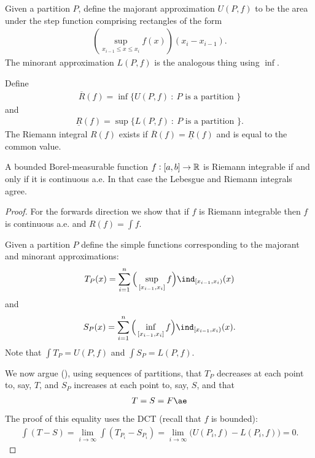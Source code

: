 \begin{definition*}
  Given a partition $P$, define the majorant approximation $U(P, f)$ to be the area under the step function
  comprising rectangles of the form
  \begin{align*}
    (\sup_{x_{i-1} \leq x \leq x_i} f(x))(x_i - x_{i-1}).
  \end{align*}
  The minorant approximation $L(P, f)$ is the analogous thing using $\inf$.

  Define
  \begin{align*}
    \overline{R}(f) = \inf \{ U(P, f) ~:~ P \text{~is a partition~}\}
  \end{align*}
  and
  \begin{align*}
    \underline{R}(f) = \sup \{ L(P, f) ~:~ P \text{~is a partition~}\}.
  \end{align*}
  The Riemann integral $R(f)$ exists if $\overline{R}(f) = \underline{R}(f)$ and is equal to the common value.
\end{definition*}

\begin{theorem*}
  A bounded Borel-measurable function $f:[a, b]\to\mathbb{R}$ is Riemann integrable if and only if it is continuous
  a.e. In that case the Lebesgue and Riemann integrals agree.
\end{theorem*}

\begin{proof}
  For the forwards direction we show that if $f$ is Riemann integrable then $f$ is continuous a.e.
  and $R(f) = \int f$.

  Given a partition $P$ define the simple functions corresponding to the majorant and minorant approximations:
  \begin{align*}
    T_P(x) = \sum_{i=1}^n \Big(\sup_{[x_{i-1}, x_i]} f\Big)\ind_{[x_{i-1}, x_i)}(x)
  \end{align*}
  and
  \begin{align*}
    S_P(x) = \sum_{i=1}^n \Big(\inf_{[x_{i-1}, x_i]} f\Big)\ind_{[x_{i-1}, x_i)}(x).
  \end{align*}
  Note that $\int T_P = U(P, f)$ and $\int S_P = L(P, f)$.

  We now argue (), using sequences of partitions, that $T_P$ decreases at each point to, say, $T$, and
  $S_P$ increases at each point to, say, $S$, and that
  \begin{align*}
    T = S = F \ae
  \end{align*}
  The proof of this equality uses the DCT (recall that $f$ is bounded):
  \begin{align*}
    \int (T - S) = \lim_{i \to \infty} \int (T_{P_i} - S_{P_i}) = \lim_{i\to\infty} \big(U(P_i, f) - L(P_i, f)\big) = 0.
  \end{align*}


\end{proof}